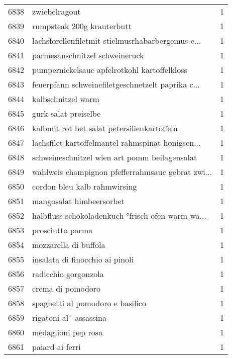 \begin{tabular}{llr}
6838 &                                      zwiebelragout &      1 \\
6839 &                         rumpsteak 200g krauterbutt &      1 \\
6840 &  lachsforellenfiletmit stielmusrhabarbergemus e... &      1 \\
6841 &                     parmesanschnitzel schweineruck &      1 \\
6842 &       pumpernickelsauc apfelrotkohl kartoffelkloss &      1 \\
6843 &  feuerpfann schweinefiletgeschnetzelt paprika c... &      1 \\
6844 &                                 kalbschnitzel warm &      1 \\
6845 &                               gurk salat preiselbe &      1 \\
6846 &        kalbmit rot bet salat petersilienkartoffeln &      1 \\
6847 &  lachsfilet kartoffelmantel rahmspinat honigsen... &      1 \\
6848 &      schweineschnitzel wien art pomm beilagensalat &      1 \\
6849 &  wahlweis champignon pfefferrahmsauc gebrat zwi... &      1 \\
6850 &                       cordon bleu kalb rahmwirsing &      1 \\
6851 &                           mangosalat himbeersorbet &      1 \\
6852 &  halbfluss schokoladenkuch °frisch ofen warm wa... &      1 \\
6853 &                                   prosciutto parma &      1 \\
6854 &                              mozzarella di buffola &      1 \\
6855 &                    insalata di finocchio ai pinoli &      1 \\
6856 &                               radicchio gorgonzola &      1 \\
6857 &                                  crema di pomodoro &      1 \\
6858 &                   spaghetti al pomodoro e basilico &      1 \\
6859 &                             rigatoni al´ assassina &      1 \\
6860 &                                medaglioni pep rosa &      1 \\
6861 &                                    paiard ai ferri &      1 \\

\end{tabular}
